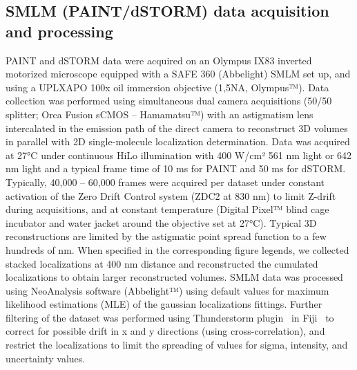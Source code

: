 \subsection{SMLM (PAINT/dSTORM) data acquisition and processing}

PAINT and dSTORM data were acquired on an Olympus IX83 inverted motorized microscope equipped with a SAFE 360 (Abbelight) SMLM set up, and using a UPLXAPO 100x oil immersion objective (1,5NA, Olympus™).
Data collection was performed using simultaneous dual camera acquisitions (50/50 splitter; Orca Fusion sCMOS -- Hamamatsu™) with an astigmatism lens intercalated in the emission path of the direct camera to reconstruct 3D volumes in parallel with 2D single-molecule localization determination.
Data was acquired at 27°C under continuous HiLo illumination with 400 W/cm² 561 nm light or 642 nm light and a typical frame time of 10 ms for PAINT and 50 ms for dSTORM.
Typically, 40,000 -- 60,000 frames were acquired per dataset under constant activation of the Zero Drift Control system (ZDC2 at 830 nm) to limit Z-drift during acquisitions, and at constant temperature (Digital Pixel™ blind cage incubator and water jacket around the objective set at 27°C).
Typical 3D reconstructions are limited by the astigmatic point spread function to a few hundreds of nm.
When specified in the corresponding figure legends, we collected stacked localizations at 400 nm distance and reconstructed the cumulated localizations to obtain larger reconstructed volumes.
SMLM data was processed using NeoAnalysis software (Abbelight™) using default values for maximum likelihood estimations (MLE) of the gaussian localizations fittings.
Further filtering of the dataset was performed using Thunderstorm plugin~\cite{ovesnyThunderSTORMComprehensiveImageJ2014} in Fiji~\cite{schindelinFijiOpensourcePlatform2012} to correct for possible drift in x and y directions (using cross-correlation), and restrict the localizations to limit the spreading of values for sigma, intensity, and uncertainty values.

